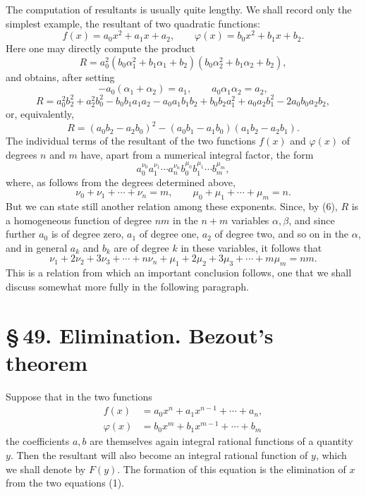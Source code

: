 \documentclass[11pt]{article}
\providecommand{\sect}[2]{\section*{\S\,#1. #2}}
\begin{document}
The computation of resultants is usually quite lengthy. We shall record only the simplest example, the resultant of two quadratic functions:
\[
f(x)=a_0x^2+a_1x+a_2,
\qquad
\varphi(x)=b_0x^2+b_1x+b_2.
\]
Here one may directly compute the product
\[
R=a_0^2(b_0\alpha_1^2+b_1\alpha_1+b_2)(b_0\alpha_2^2+b_1\alpha_2+b_2),
\]
and obtains, after setting
\[
-a_0(\alpha_1+\alpha_2)=a_1,
\qquad
a_0\alpha_1\alpha_2=a_2,
\]
\begin{equation}
R=a_0^2b_2^2+a_2^2b_0^2-b_0b_1a_1a_2-a_0a_1b_1b_2+b_0b_2a_1^2+a_0a_2b_1^2-2a_0b_0a_2b_2,
\tag{11}
\end{equation}
or, equivalently,
\begin{equation}
R=(a_0b_2-a_2b_0)^2-(a_0b_1-a_1b_0)(a_1b_2-a_2b_1).
\tag{12}
\end{equation}
The individual terms of the resultant of the two functions $f(x)$ and $\varphi(x)$ of degrees $n$ and $m$ have, apart from a numerical integral factor, the form
\begin{equation}
a_0^{\nu_0}a_1^{\nu_1}\cdots a_n^{\nu_n} b_0^{\mu_0}b_1^{\mu_1}\cdots b_m^{\mu_m},
\tag{13}
\end{equation}
where, as follows from the degrees determined above,
\begin{equation}
\nu_0+\nu_1+\cdots+\nu_n=m,
\qquad
\mu_0+\mu_1+\cdots+\mu_m=n.
\tag{14}
\end{equation}
But we can state still another relation among these exponents. Since, by (6), $R$ is a homogeneous function of degree $nm$ in the $n+m$ variables $\alpha,\beta$, and since further $a_0$ is of degree zero, $a_1$ of degree one, $a_2$ of degree two, and so on in the $\alpha$, and in general $a_k$ and $b_k$ are of degree $k$ in these variables, it follows that
\begin{equation}
\nu_1+2\nu_2+3\nu_3+\cdots+n\nu_n+
\mu_1+2\mu_2+3\mu_3+\cdots+m\mu_m=nm.
\tag{15}
\end{equation}
This is a relation from which an important conclusion follows, one that we shall discuss somewhat more fully in the following paragraph.

\sect{49}{Elimination. Bezout's theorem}

Suppose that in the two functions
\begin{equation}
\begin{aligned}
f(x)&=a_0x^n+a_1x^{n-1}+\cdots+a_n,\\
\varphi(x)&=b_0x^m+b_1x^{m-1}+\cdots+b_m
\end{aligned}
\tag{1}
\end{equation}
the coefficients $a,b$ are themselves again integral rational functions of a quantity $y$. Then the resultant will also become an integral rational function of $y$, which we shall denote by $F(y)$. The formation of this equation is the elimination of $x$ from the two equations (1).
\end{document}
